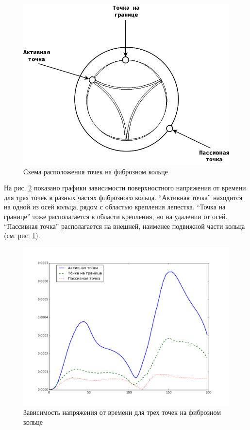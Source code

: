 \begin{figure}[htbp]
\centering
\includegraphics{valve_points.png}
\caption{\label{fig:points_scheme}Схема расположения точек на фиброзном
кольце}
\end{figure}

На рис. \ref{fig:fibrouse_forces} показано графики зависимости
поверхностного напряжения от времени для трех точек в разных частях
фиброзного кольца. ``Активная точка'' находится на одной из осей кольца,
рядом с областью крепления лепестка. ``Точка на границе'' тоже
располагается в области крепления, но на удалении от осей. ``Пассивная
точка'' располагается на внешней, наименее подвижной части кольца (см.
рис. \ref{fig:points_scheme}).

\begin{figure}[htbp]
\centering
\includegraphics{forces.png}
\caption{\label{fig:fibrouse_forces}Зависимость напряжения от времени
для трех точек на фиброзном кольце}
\end{figure}

